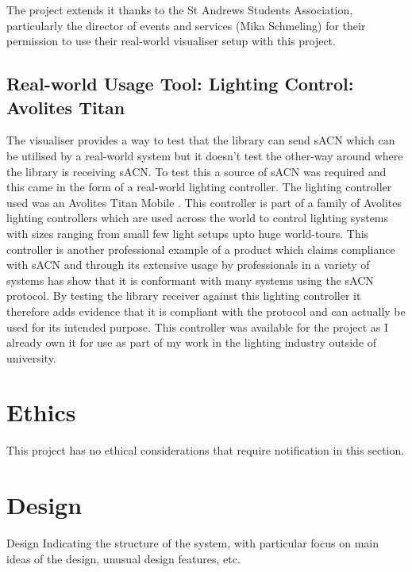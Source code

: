 \documentclass[11pt,a4paper]{article}
\begin{document}
The project extends it thanks to the St Andrews Students Association, particularly the director of events and services (Mika Schmeling) for their permission to use their real-world visualiser setup with this project.

\subsection{Real-world Usage Tool: Lighting Control: Avolites Titan}
The visualiser provides a way to test that the library can send sACN which can be utilised by a real-world system but it doesn't test the other-way around where the library is receiving sACN. To test this a source of sACN was required and this came in the form of a real-world lighting controller. The lighting controller used was an Avolites Titan Mobile \cite{AVO_TITAN_MOBILE}. This controller is part of a family of Avolites lighting controllers which are used across the world to control lighting systems with sizes ranging from small few light setups upto huge world-tours. This controller is another professional example of a product which claims compliance with sACN and through its extensive usage by professionals in a variety of systems has show that it is conformant with many systems using the sACN protocol. By testing the library receiver against this lighting controller it therefore adds evidence that it is compliant with the protocol and can actually be used for its intended purpose. This controller was available for the project as I already own it for use as part of my work in the lighting industry outside of university. 

\section{Ethics}
This project has no ethical considerations that require notification in this section.

\section{Design}
Design
Indicating the structure of the system, with particular
focus on main ideas of the design, unusual design
features, etc.
\end{document}

